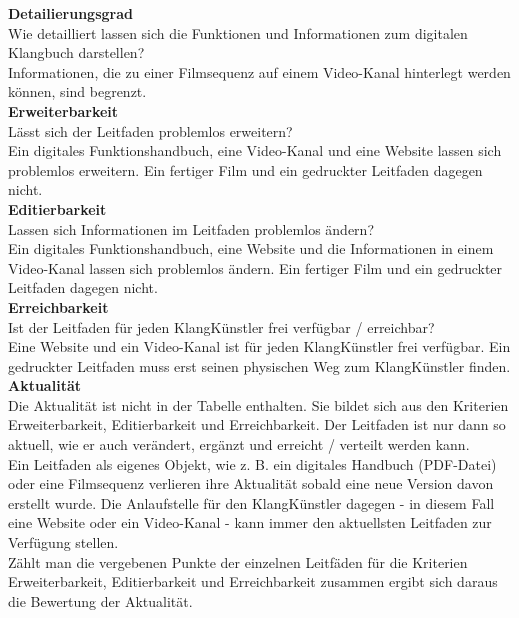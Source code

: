 \textbf{Detailierungsgrad}\\
Wie detailliert lassen sich die Funktionen und Informationen zum digitalen Klangbuch darstellen?\\
Informationen, die zu einer Filmsequenz auf einem Video-Kanal hinterlegt werden können, sind begrenzt.\\


\textbf{Erweiterbarkeit}\\
Lässt sich der Leitfaden problemlos erweitern?\\
Ein digitales Funktionshandbuch, eine Video-Kanal und eine Website lassen sich problemlos erweitern. Ein fertiger Film und ein gedruckter Leitfaden dagegen nicht.\\


\textbf{Editierbarkeit}\\
Lassen sich Informationen im Leitfaden problemlos ändern?\\
Ein digitales Funktionshandbuch, eine Website und die Informationen in einem Video-Kanal lassen sich problemlos ändern. Ein fertiger Film und ein gedruckter Leitfaden dagegen nicht.\\


\textbf{Erreichbarkeit}\\
Ist der Leitfaden für jeden KlangKünstler frei verfügbar / erreichbar?\\
Eine Website und ein Video-Kanal ist für jeden KlangKünstler frei verfügbar. Ein gedruckter Leitfaden muss erst seinen physischen Weg zum KlangKünstler finden.\\


\textbf{Aktualität}\\
Die Aktualität ist nicht in der Tabelle enthalten. Sie bildet sich aus den Kriterien Erweiterbarkeit, Editierbarkeit und Erreichbarkeit. Der Leitfaden ist nur dann so aktuell, wie er auch verändert, ergänzt und erreicht / verteilt werden kann.\\Ein Leitfaden als eigenes Objekt, wie z. B. ein digitales Handbuch (PDF-Datei) oder eine Filmsequenz verlieren ihre Aktualität sobald eine neue Version davon erstellt wurde. Die Anlaufstelle für den KlangKünstler dagegen - in diesem Fall eine Website oder ein Video-Kanal - kann immer den aktuellsten Leitfaden zur Verfügung stellen.\\
Zählt man die vergebenen Punkte der einzelnen Leitfäden für die Kriterien Erweiterbarkeit, Editierbarkeit und Erreichbarkeit zusammen ergibt sich daraus die Bewertung der Aktualität.\\

